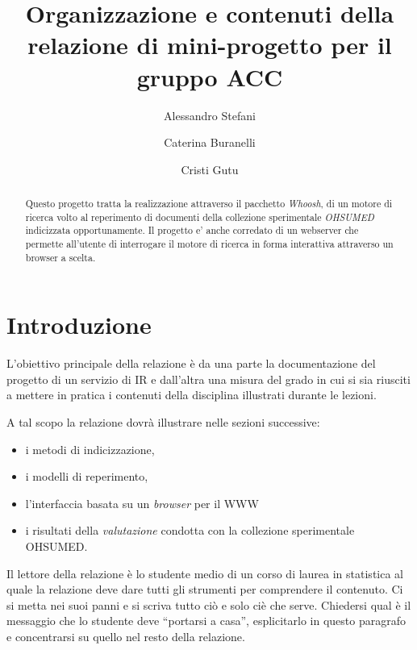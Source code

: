 \documentclass[runningheads]{llncs}
\begin{document}
%
\title{Organizzazione e contenuti della relazione di mini-progetto per il gruppo ACC}
%
%
\author{%
  Alessandro Stefani \and
  Caterina Buranelli \and
  Cristi Gutu}
%
%
%
\maketitle
%
\begin{abstract}
Questo progetto tratta la realizzazione attraverso il pacchetto \emph{Whoosh}, di un motore di ricerca
volto al reperimento di documenti della collezione sperimentale \emph{OHSUMED} indicizzata opportunamente.
Il progetto e' anche corredato di un webserver che permette all'utente di interrogare il motore di ricerca
in forma interattiva attraverso un browser a scelta.
\end{abstract}

\section{Introduzione}
\label{sec:introduzione}

L'obiettivo principale della relazione \`e da una parte la
documentazione del progetto di un servizio di {IR} e dall'altra una
misura del grado in cui si sia riusciti a mettere in pratica i
contenuti della disciplina illustrati durante le lezioni.

A tal scopo la relazione dovr\`a illustrare nelle sezioni successive:
\begin{itemize}
\item i metodi di indicizzazione,
\item i modelli di reperimento,
\item l'interfaccia basata su un \textit{browser} per il {WWW}
\item i risultati della \emph{valutazione} condotta con la collezione
  sperimentale OHSUMED.
\end{itemize}
Il lettore della relazione \`e lo studente medio di un corso di laurea
in statistica al quale la relazione deve dare tutti gli strumenti per
comprendere il contenuto.  Ci si metta nei suoi panni e si scriva
tutto ci\`o e solo ci\`e che serve.  Chiedersi qual \`e il messaggio
che lo studente deve ``portarsi a casa'', esplicitarlo in questo
paragrafo e concentrarsi su quello nel resto della relazione.
\end{document}

